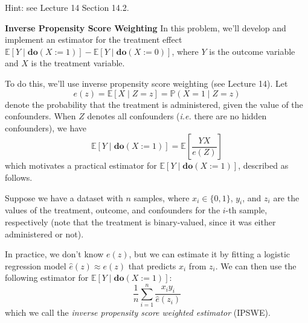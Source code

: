 \documentclass[12pt, addpoints]{exam}
\begin{document}
\begin{questions}
\begin{parts}
Hint: see Lecture 14 Section 14.2.

\end{parts}


\question[20] \textbf{Inverse Propensity Score Weighting}
In this problem, we'll develop and implement an estimator for the treatment effect $\mathbb{E}[Y \mid \mathbf{do}(X := 1)] - \mathbb{E}[Y \mid \mathbf{do}(X := 0)]$, where $Y$ is the outcome variable and $X$ is the treatment variable.

To do this, we'll use inverse propensity score weighting (see Lecture 14). Let
\[e(z) = \mathbb{E}[X \mid Z = z] = \mathbb{P}(X = 1\mid Z = z) \]
denote the probability that the treatment is administered, given the value of the confounders. When $Z$ denotes all confounders (\textit{i.e.} there are no hidden confounders), we have
\[\mathbb{E}[Y \mid \mathbf{do}(X := 1)] = \mathbb{E}\left[\frac{YX}{e(Z)}\right]\] 
which motivates a practical estimator for $\mathbb{E}[Y \mid \mathbf{do}(X := 1)]$, described as follows.

Suppose we have a dataset with $n$ samples, where $x_i \in \{0, 1\}$, $y_i$, and $z_i$ are the values of the treatment, outcome, and confounders for the $i$-th sample, respectively (note that the treatment is binary-valued, since it was either administered or not).

In practice, we don't know $e(z)$, but we can estimate it by fitting a logistic regression model $\hat{e}(z) \approx e(z)$ that predicts $x_i$ from $z_i$. We can then use the following estimator for $\mathbb{E}[Y \mid \mathbf{do}(X := 1)]$:
\[\frac{1}{n}\sum_{i = 1}^n \frac{x_i y_i}{\hat{e}(z_i)}\]
which we call the \textit{inverse propensity score weighted estimator} (IPSWE).

\end{questions}
\end{document}
